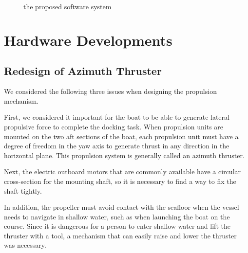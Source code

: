 \documentclass[lettersize,journal]{IEEEtran}
\begin{document}
\begin{figure}[htbp]
    \begin{center}
    \end{center}
    \caption{the proposed software system}
    \label{fig:pss}
\end{figure}

\section{Hardware Developments}

\subsection{Redesign of Azimuth Thruster}

We considered the following three issues when designing the propulsion mechanism.

First, we considered it important for the boat to be able to generate lateral propulsive force to complete the docking task.
When propulsion units are mounted on the two aft sections of the boat, each propulsion unit must have a degree of freedom in the yaw axis to generate thrust in any direction in the horizontal plane.
This propulsion system is generally called an azimuth thruster.

Next, the electric outboard motors that are commonly available have a circular cross-section for the mounting shaft, so it is necessary to find a way to fix the shaft tightly.

In addition, the propeller must avoid contact with the seafloor when the vessel needs to navigate in shallow water, such as when launching the boat on the course. Since it is dangerous for a person to enter shallow water and lift the thruster with a tool, a mechanism that can easily raise and lower the thruster was necessary.
\end{document}
